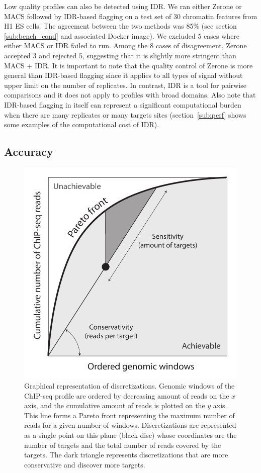 \documentclass{bioinfo}
\begin{document}
Low quality profiles can also be detected using IDR. We ran either
Zerone or MACS followed by IDR-based flagging on a test
set of 30 chromatin features from H1 ES cells. The agreement
between the two methods was 85\% (see section
\ref{sub:bench_cond} and associated Docker image). We excluded 5
cases where either MACS or IDR failed to run. Among the 8 cases
of disagreement, Zerone accepted 3 and rejected 5, suggesting that
it is slightly more stringent than MACS + IDR. It is important to
note that the quality control of Zerone is more general than IDR-based
flagging since
it applies to all types of signal without upper limit on the number
of replicates. In contrast, IDR is a tool for pairwise comparisons
and it does not apply to profiles with broad domains. Also
note that IDR-based flagging in itself can represent a significant
computational burden when there are many replicates or many targets
sites (section~\ref{sub:perf} shows some examples of the computational
cost of IDR).

\subsection{Accuracy}

\begin{figure}[!tpb]
\centerline{\includegraphics[scale=0.5]{pareto_front_explanation.pdf}}
\caption{
  Graphical representation of discretizations. Genomic
  windows of the ChIP-seq profile are ordered by decreasing amount of
  reads on the $x$ axis, and the cumulative amount of reads is plotted
  on the $y$ axis. This line forms a Pareto front representing the
  maximum number of reads for a given number of windows. Discretizations
  are represented as a single point on this plane (black disc) whose
  coordinates are the number of targets and the total number of reads
  covered by the targets. The dark triangle represents discretizations
  that are more conservative and discover more targets.
}
\label{fig:expl}
\end{figure}
\end{document}
